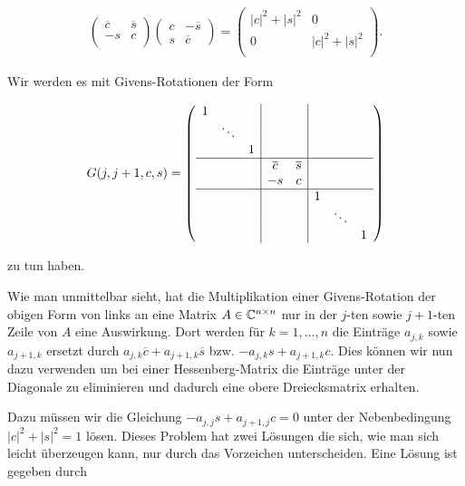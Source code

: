 \documentclass{article}
\begin{document}
\begin{theorem}
\begin{align*}
\left(\begin{array}{cc}
\overline{c}& \overline{s} \\
-s & c\\
\end{array}\right)\left(\begin{array}{cc}
c & -\overline{s} \\
s & \overline{c}
\end{array}\right)
=
\left(\begin{array}{cc}
|c|^2 + |s|^2 & 0 \\
0 & |c|^2 + |s|^2 \\
\end{array}\right).
\end{align*}


Wir werden es mit Givens-Rotationen der Form

$$
G(j,j+1,c,s) =
    \left(\begin{array}{ccc|cc|ccc}
    1 & & & & & & & \\
    & \ddots & & & & & & \\
    & & 1 & & & & & \\
    \hline
    & & & \overline{c} & \overline{s} & & & \\
    & & & -s & c & & &\\
    \hline
    & & & & & 1 & & \\
    & & & & & & \ddots & \\
    & & & & & & & 1\\
    \end{array}\right)
$$

zu tun haben.

Wie man unmittelbar sieht, hat die Multiplikation einer Givens-Rotation der obigen Form von links an eine Matrix $A\in \mathbb{C}^{n\times n}$ nur in der $j$-ten sowie $j+1$-ten Zeile von $A$ eine Auswirkung. Dort werden für $k = 1,\dots, n$ die Einträge $a_{j,k}$ sowie $a_{j+1, k}$ ersetzt durch $a_{j,k}\overline{c} + a_{j+1, k}\overline{s}$ bzw. $-a_{j,k}s + a_{j+1, k}c$. Dies können wir nun dazu verwenden um bei einer Hessenberg-Matrix die Einträge unter der Diagonale zu eliminieren und dadurch eine obere Dreiecksmatrix erhalten.

Dazu müssen wir die Gleichung $-a_{j,j}s + a_{j+1, j}c = 0$ unter der Nebenbedingung $|c|^2 + |s|^2 = 1$ lösen. Dieses Problem hat zwei Lösungen die sich, wie man sich leicht überzeugen kann, nur durch das Vorzeichen unterscheiden. Eine Lösung ist gegeben durch


\end{theorem}
\end{document}
